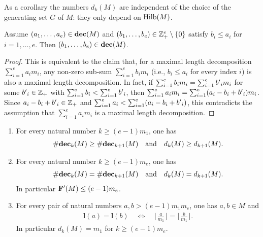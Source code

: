 As a corollary the numbers $d_k(M)$ are independent of the choice of the generating set $G$ of $M$: they only depend on $\operatorname{Hilb}(M)$.

\begin{lemma}\label{subsum}
Assume $(a_1,\ldots,a_e)\in\textbf{dec}(M)$ and $(b_1,\ldots,b_e)\in\mathbb Z_+^e\setminus\{0\}$ satisfy $b_i\le a_i$ for $i=1,\ldots,e$. Then $(b_1,\ldots,b_e)\in\textbf{dec}(M)$.
\end{lemma}

\begin{proof}
This is equivalent to the claim that, for a maximal length decomposition $\sum_{i=1}^e a_im_i$, any non-zero sub-sum $\sum_{i=1}^e b_im_i$ (i.e., $b_i\le a_i$ for every index $i$) is also a maximal length decomposition. In fact, if $\sum_{i=1}^e b_im_i=\sum_{i=1}^e b\rq{}_im_i$ for some $b\rq{}_i\in\ZZ_+$ with $\sum_{i=1}^e b_i<\sum_{i=1}^e b\rq{}_i$, then $\sum_{i=1}^e a_im_i=\sum_{i=1}^e(a_i-b_i+b\rq{}_i)m_i$. Since $a_i-b_i+b\rq{}_i\in\ZZ_+$ and $\sum_{i=1}^e a_i<\sum_{i=1}^e(a_i-b_i+b\rq{}_i)$, this contradicts the assumption that $\sum_{i=1}^e a_im_i$ is a maximal length decomposition.
\end{proof}


\begin{theorem} \label{stabilization}
\leavevmode
\begin{enumerate}[label=(\alph*)]
\item  For every natural number $k\ge(e-1)m_1$, one has
\begin{align*}
\#\textbf{dec}_k(M)\ge\#\textbf{dec}_{k+1}(M)\quad\text{and}\quad d_k(M)\ge d_{k+1}(M).
\end{align*}
\item For every natural number $k\ge(e-1)m_e$, one has
\begin{align*}
\#\textbf{dec}_k(M)=\#\textbf{dec}_{k+1}(M)\quad\text{and}\quad d_k(M)=d_{k+1}(M).
\end{align*}
In particular $\F\rq{}(M) \leq (e-1)m_e$.
\item For every pair of natural numbers $a,b>(e-1)m_1m_e$, one has $a, b \in M$ and
\begin{align*}
\textbf{l}(a)=\textbf{l}(b)\quad\Longleftrightarrow\quad\bigg\lfloor{\frac a{m_1}}\bigg\rfloor=\bigg\lfloor{\frac b{m_1}}\bigg\rfloor.
\end{align*}
In particular $d_k(M)=m_1$ for $k\ge(e-1)m_e$.
\end{enumerate}

\end{theorem}

